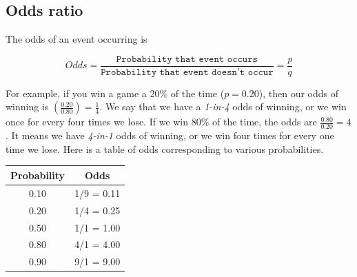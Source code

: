 \documentclass[11pt, chapterprefix=true]{scrbook}\usepackage[]{graphicx}\usepackage[]{color}
\begin{document}
% 
% 
% 
% 

\subsection{Odds ratio}

The odds of an event occurring is

\begin{equation*}
  Odds = \frac{ \texttt{Probability that event occurs}}{\texttt{Probability that event doesn't occur}} = \frac{p}{q}
\end{equation*}

For example, if you win a game a 20\% of the time ($p = 0.20$), then our odds of winning is $( \frac{0.20}{0.80}) = \frac{1}{4}$.  We say that we have a \textit{1-in-4} odds of winning, or we win once for every four times we lose.  If we win 80\% of the time, the odds are $\frac{0.80}{0.20} = 4$. It means we have \textit{4-in-1} odds of winning, or we win four times for every one time we lose.  Here is a table of odds corresponding to various probabilities.

\begin{table}[ht]
\centering
\begin{tabular}{@{} cc @{}} \hline
Probability & Odds \\ \hline
0.10 & 1/9 = 0.11 \\
0.20 & 1/4 = 0.25 \\
0.50 & 1/1 = 1.00 \\
0.80 & 4/1 = 4.00 \\
0.90 & 9/1 = 9.00 \\ \hline
\end{tabular}
\end{table}
\end{document}
